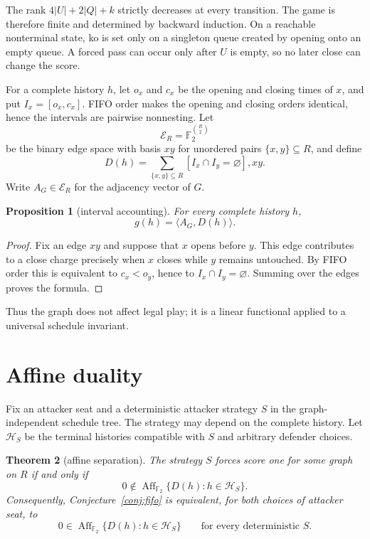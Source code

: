 \documentclass[11pt]{article}
\newtheorem{theorem}{Theorem}[section]
\newtheorem{proposition}[theorem]{Proposition}
\theoremstyle{definition}
\theoremstyle{remark}
\begin{document}
The rank $4|U|+2|Q|+k$ strictly decreases at every transition.  The game is
therefore finite and determined by backward induction.  On a reachable
nonterminal state, ko is set only on a singleton queue created by opening
onto an empty queue.  A forced pass can occur only after $U$ is empty, so no
later close can change the score.

For a complete history $h$, let $o_x$ and $c_x$ be the opening and closing
times of $x$, and put $I_x=[o_x,c_x]$.  FIFO order makes the opening and
closing orders identical, hence the intervals are pairwise nonnesting.  Let
\[
  \mathcal E_R=\mathbb F_2^{\binom R2}
\]
be the binary edge space with basis $xy$ for unordered pairs
$\{x,y\}\subseteq R$, and define
\[
  D(h)=\sum_{\{x,y\}\subseteq R}
       [I_x\cap I_y=\varnothing],xy.
\]
Write $A_G\in\mathcal E_R$ for the adjacency vector of $G$.

\begin{proposition}[interval accounting]\label{prop:interval}
For every complete history $h$,
\[
  g(h)=\langle A_G,D(h)\rangle.
\]
\end{proposition}

\begin{proof}
Fix an edge $xy$ and suppose that $x$ opens before $y$.  This edge
contributes to a close charge precisely when $x$ closes while $y$ remains
untouched.  By FIFO order this is equivalent to $c_x<o_y$, hence to
$I_x\cap I_y=\varnothing$.  Summing over the edges proves the formula.
\end{proof}

Thus the graph does not affect legal play; it is a linear functional applied
to a universal schedule invariant.

\section{Affine duality}\label{sec:affine}

Fix an attacker seat and a deterministic attacker strategy $S$ in the
graph-independent schedule tree.  The strategy may depend on the complete
history.  Let $\mathcal H_S$ be the terminal histories compatible with $S$
and arbitrary defender choices.

\begin{theorem}[affine separation]\label{thm:affine}
The strategy $S$ forces score one for some graph on $R$ if and only if
\[
  0\notin\operatorname{Aff}_{\mathbb F_2}
       \{D(h):h\in\mathcal H_S\}.
\]
Consequently, Conjecture~\ref{conj:fifo} is equivalent, for both choices of
attacker seat, to
\[
  0\in\operatorname{Aff}_{\mathbb F_2}
       \{D(h):h\in\mathcal H_S\}
  \qquad\text{for every deterministic }S.
\]
\end{theorem}
\end{document}
